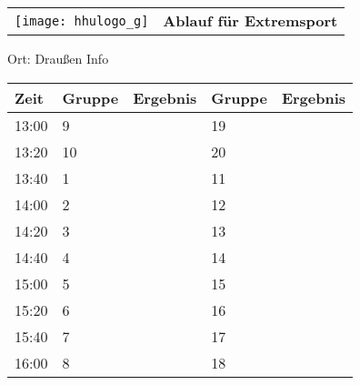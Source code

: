 \documentclass[a4paper,10pt]{article}
\def\spieli{Extremsport}
\def\raumi{Draußen Info}
\begin{document}
   \newpage
  \begin{tabularx}{\textwidth}{lc}
    \texttt{[image: hhulogo\_g]}
  & {\Huge \textbf{Ablauf für \spieli}}
  \end{tabularx}
  \LARGE
  \begin{center}
    \vspace{1cm} 
    Ort: \raumi
  \end{center}
    \vspace{2cm} 
    \begin{tabularx}{\textwidth}{X||X|X||X|X}
	\textbf{Zeit} &\textbf{Gruppe} & \textbf{Ergebnis} &\textbf{Gruppe} & \textbf{Ergebnis}  	\\ \hline \hline
	13:00 &	9	&	&19	&	\\ \hline
	13:20 &	10	&	&20	&	\\ \hline
	13:40 &	1	&	&11	&	\\ \hline

	14:00 &	2	&	&12	&	\\ \hline
	14:20 &	3	&	&13	&	\\ \hline
	14:40 &	4	&	&14	&	\\ \hline

	15:00 &	5	&	&15	&	\\ \hline
	15:20 &	6	&	&16	&	\\ \hline
	15:40 &	7	&	&17	&	\\ \hline

	16:00 &	8	&	&18	&	\\ \hline
      
    \end{tabularx}
   
\end{document}

